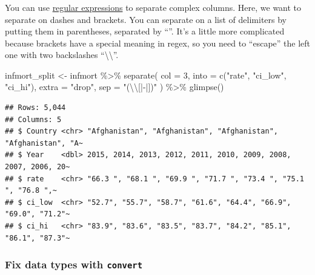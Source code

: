 \documentclass[
  oneside]{book}
\newenvironment{Shaded}{\begin{snugshade}}{\end{snugshade}}
\newcommand{\AttributeTok}[1]{\textcolor[rgb]{0.77,0.63,0.00}{#1}}
\newcommand{\DecValTok}[1]{\textcolor[rgb]{0.00,0.00,0.81}{#1}}
\newcommand{\FunctionTok}[1]{\textcolor[rgb]{0.00,0.00,0.00}{#1}}
\newcommand{\NormalTok}[1]{#1}
\newcommand{\OtherTok}[1]{\textcolor[rgb]{0.56,0.35,0.01}{#1}}
\newcommand{\SpecialCharTok}[1]{\textcolor[rgb]{0.00,0.00,0.00}{#1}}
\newcommand{\StringTok}[1]{\textcolor[rgb]{0.31,0.60,0.02}{#1}}
\begin{document}
\hypertarget{regex}{%
\subsubsection*{}\label{regex}}

\begin{warning}
You can use \href{https://stat.ethz.ch/R-manual/R-devel/library/base/html/regex.html}{regular expressions}
to separate complex columns. Here, we want to separate on dashes and brackets. You can separate on a list of delimiters by putting them in parentheses, separated by ``\textbar{}''. It's a little more complicated because brackets have a special meaning in regex, so you need to ``escape'' the left one with two backslashes ``\textbackslash\textbackslash{}''.

\end{warning}

\begin{Shaded}
\begin{Highlighting}[]
\NormalTok{infmort\_split }\OtherTok{\textless{}{-}}\NormalTok{ infmort }\SpecialCharTok{\%\textgreater{}\%}
  \FunctionTok{separate}\NormalTok{(}
    \AttributeTok{col =} \DecValTok{3}\NormalTok{, }
    \AttributeTok{into =} \FunctionTok{c}\NormalTok{(}\StringTok{"rate"}\NormalTok{, }\StringTok{"ci\_low"}\NormalTok{, }\StringTok{"ci\_hi"}\NormalTok{), }
    \AttributeTok{extra =} \StringTok{"drop"}\NormalTok{, }
    \AttributeTok{sep =} \StringTok{"(}\SpecialCharTok{\textbackslash{}\textbackslash{}}\StringTok{[|{-}|])"}
\NormalTok{  ) }\SpecialCharTok{\%\textgreater{}\%}
  \FunctionTok{glimpse}\NormalTok{()}
\end{Highlighting}
\end{Shaded}

\begin{verbatim}
## Rows: 5,044
## Columns: 5
## $ Country <chr> "Afghanistan", "Afghanistan", "Afghanistan", "Afghanistan", "A~
## $ Year    <dbl> 2015, 2014, 2013, 2012, 2011, 2010, 2009, 2008, 2007, 2006, 20~
## $ rate    <chr> "66.3 ", "68.1 ", "69.9 ", "71.7 ", "73.4 ", "75.1 ", "76.8 ",~
## $ ci_low  <chr> "52.7", "55.7", "58.7", "61.6", "64.4", "66.9", "69.0", "71.2"~
## $ ci_hi   <chr> "83.9", "83.6", "83.5", "83.7", "84.2", "85.1", "86.1", "87.3"~
\end{verbatim}

\hypertarget{convert}{%
\subsubsection{\texorpdfstring{Fix data types with \texttt{convert}}{Fix data types with convert}}\label{convert}}
\end{document}
